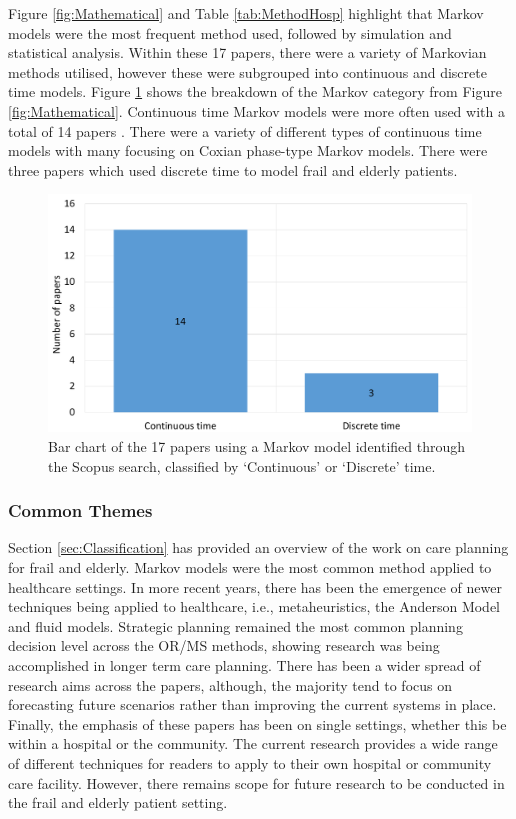 \documentclass[../thesis.tex]{subfiles}
\begin{document}
Figure \ref{fig:Mathematical} and Table \ref{tab:MethodHosp} highlight that Markov models were the most frequent method used, followed by simulation and statistical analysis. Within these 17 papers, there were a variety of Markovian methods utilised, however these were subgrouped into continuous and discrete time models. Figure \ref{Fig:markov} shows the breakdown of the Markov category from Figure \ref{fig:Mathematical}. Continuous time Markov models were more often used with a total of 14 papers \cite{Christodoulou,Faddy,Franklin, Garg1, Gordon1, Gordon2, Hamdani, Marshall1, Marshall2, Marshall3,McClean, Shaw, Taylor, Xie}. There were a variety of different types of continuous time models with many focusing on Coxian phase-type Markov models. There were three papers which used discrete time \cite{Garg2,Hare, Patrick} to model frail and elderly patients.

\begin{figure}[H]
\centering
    \includegraphics[scale = 0.3]{Chapter2/Figures/Markov1.pdf}
 \caption{Bar chart of the 17 papers using a Markov model identified through the Scopus search, classified by `Continuous' or `Discrete' time.}
 \label{Fig:markov}
\end{figure}

\subsubsection{Common Themes}
Section \ref{sec:Classification} has provided an overview of the work on care planning for frail and elderly. Markov models were the most common method applied to healthcare settings. In more recent years, there has been the emergence of newer techniques being applied to healthcare, i.e., metaheuristics, the Anderson Model and fluid models. Strategic planning remained the most common planning decision level across the OR/MS methods, showing research was being accomplished in longer term care planning. There has been a wider spread of research aims across the papers, although, the majority tend to focus on forecasting future scenarios rather than improving the current systems in place. Finally, the emphasis of these papers has been on single settings, whether this be within a hospital or the community. The current research provides a wide range of different techniques for readers to apply to their own hospital or community care facility. However, there remains scope for future research to be conducted in the frail and elderly patient setting.
\end{document}
